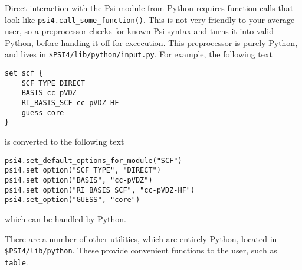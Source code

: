 Direct interaction with the Psi module from Python requires function calls that
look like {\tt psi4.call\_some\_function()}.  This is not very friendly to
your average user, so a preprocessor checks for known Psi syntax and turns it
into valid Python, before handing it off for excecution.  This preprocessor is
purely Python, and lives in {\tt \$PSI4/lib/python/input.py}.  For example, the
following text \begin{verbatim}
set scf {
    SCF_TYPE DIRECT
    BASIS cc-pVDZ
    RI_BASIS_SCF cc-pVDZ-HF
    guess core
}
\end{verbatim}
is converted to the following text
\begin{verbatim}
psi4.set_default_options_for_module("SCF")
psi4.set_option("SCF_TYPE", "DIRECT")
psi4.set_option("BASIS", "cc-pVDZ")
psi4.set_option("RI_BASIS_SCF", "cc-pVDZ-HF")
psi4.set_option("GUESS", "core")
\end{verbatim}
which can be handled by Python.

There are a number of other utilities, which are entirely Python, located in
{\tt \$PSI4/lib/python}.  These provide convenient functions to the user, such
as {\tt table}.


